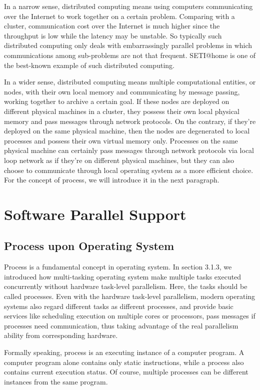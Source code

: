 \documentclass[12pt,a4]{report}
\begin{document}
In a narrow sense, distributed computing means using computers communicating over the Internet to work together on a certain problem. Comparing with a cluster, communication cost over the Internet is much higher since the throughput is low while the latency may be unstable. So typically such distributed computing only deals with embarrassingly parallel problems in which communications among sub-problems are not that frequent. SETI@home is one of the best-known example of such distributed computing.

In a wider sense, distributed computing means multiple computational entities, or nodes, with their own local memory and communicating by message passing, working together to archive a certain goal. If these nodes are deployed on different physical machines in a cluster, they possess their own local physical memory and pass messages through network protocols. On the contrary, if they're deployed on the same physical machine, then the nodes are degenerated to local processes and possess their own virtual memory only. Processes on the same physical machine can certainly pass messages through network protocols via local loop network as if they're on different physical machines, but they can also choose to communicate through local operating system as a more efficient choice. For the concept of process, we will introduce it in the next paragraph.

\section{Software Parallel Support}

\subsection{Process upon Operating System}

Process is a fundamental concept in operating system. In section 3.1.3, we introduced how multi-tasking operating system make multiple tasks executed concurrently without hardware task-level parallelism. Here, the tasks should be called processes. Even with the hardware task-level parallelism, modern operating systems also regard different tasks as different processes, and provide basic services like scheduling execution on multiple cores or processors, pass messages if processes need communication, thus taking advantage of the real parallelism ability from corresponding hardware.

Formally speaking, process is an executing instance of a computer program. A computer program alone contains only static instructions, while a process also contains current execution status. Of course, multiple processes can be different instances from the same program.
\end{document}
